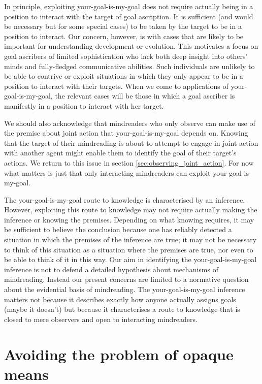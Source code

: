 \documentclass[12pt,\papersize]{extarticle}
\begin{document}
In principle,
exploiting your-goal-is-my-goal does not require actually being in a position to interact with the target of goal ascription.
It is sufficient (and would be necessary but for some special cases) to be taken by the target to be in a position to interact. 
Our concern, however,
is with cases that are likely to be important for understanding
development or evolution.
This motivates a focus on goal ascribers of limited sophistication
who lack both deep insight into others' minds and fully-fledged communicative abilities.
Such individuals are unlikely to be able to contrive or exploit situations in which they only appear to be in a position to interact with their targets.
When we come to applications of your-goal-is-my-goal, the relevant cases will be those 
in which a goal ascriber is manifestly in a position to interact with her target.

We should also acknowledge that 
mindreaders who only observe can make use of the premise about joint action that your-goal-is-my-goal depends on.  
Knowing that the target of their mindreading  is about to attempt to engage in joint action with another agent might enable them to identify the goal of their target's actions. 
We return to this issue in section \vref{sec:observing_joint_action}. 
For now what matters is just that only interacting mindreaders can exploit your-goal-is-my-goal.

The your-goal-is-my-goal route to knowledge is characterised by an inference.  
However, exploiting this route to knowledge may not require actually making the inference or knowing the premises.  
Depending on what knowing requires,
it may be sufficient to believe the conclusion because one has reliably detected a situation in which the premises of the inference are true;
it may not be necessary to think of this situation as a situation where the premises are true,
nor even to be able to think of it in this way.
Our aim in identifying the your-goal-is-my-goal inference is not to 
defend a detailed hypothesis about  mechanisms of mindreading.
Instead our present concerns are limited to a normative question about the evidential basis of mindreading.
The your-goal-is-my-goal inference matters
not because it describes exactly how anyone actually assigns goals (maybe it doesn't)
but because 
it characterises a route to knowledge
that is closed to mere observers
and open to interacting mindreaders.
 

\section{Avoiding the problem of opaque means}
\end{document}
